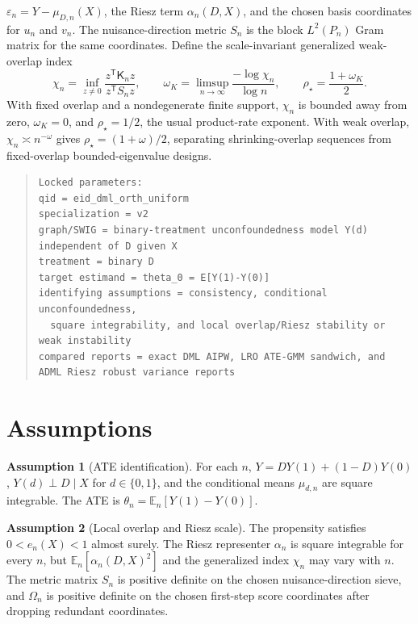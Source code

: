 \documentclass[11pt]{article}
\newcommand{\E}{\mathbb{E}}
\newcommand{\transpose}{\mathsf{T}}
\theoremstyle{definition}
\newtheorem{assumption}{Assumption}
\theoremstyle{plain}
\theoremstyle{remark}
\begin{document}
\(\varepsilon_n=Y-\mu_{D,n}(X)\), the Riesz term \(\alpha_n(D,X)\), and the
chosen basis coordinates for \(u_n\) and \(v_n\).  The nuisance-direction
metric \(S_n\) is the block \(L^2(P_n)\) Gram matrix for the same coordinates.
Define the scale-invariant generalized weak-overlap index
\[
\chi_n=\inf_{z\ne 0}\frac{z^{\transpose}\mathsf K_nz}{z^{\transpose}S_nz},
\qquad
\omega_K=\limsup_{n\to\infty}\frac{-\log \chi_n}{\log n},
\qquad
\rho_\star=\frac{1+\omega_K}{2}.
\]
With fixed overlap and a nondegenerate finite support, \(\chi_n\) is bounded
away from zero, \(\omega_K=0\), and \(\rho_\star=1/2\), the usual
product-rate exponent.  With weak overlap, \(\chi_n\asymp n^{-\omega}\) gives
\(\rho_\star=(1+\omega)/2\), separating shrinking-overlap sequences from
fixed-overlap bounded-eigenvalue designs.

\begin{quote}
\begin{verbatim}
Locked parameters:
qid = eid_dml_orth_uniform
specialization = v2
graph/SWIG = binary-treatment unconfoundedness model Y(d) independent of D given X
treatment = binary D
target estimand = theta_0 = E[Y(1)-Y(0)]
identifying assumptions = consistency, conditional unconfoundedness,
  square integrability, and local overlap/Riesz stability or weak instability
compared reports = exact DML AIPW, LRO ATE-GMM sandwich, and ADML Riesz robust variance reports
\end{verbatim}
\end{quote}

\section{Assumptions}
\begin{assumption}[ATE identification]\label{ass:ate-id}
For each \(n\), \(Y=DY(1)+(1-D)Y(0)\), \(Y(d)\perp D\mid X\) for
\(d\in\{0,1\}\), and the conditional means \(\mu_{d,n}\) are square
integrable.  The ATE is \(\theta_n=\E_n[Y(1)-Y(0)]\).
\end{assumption}

\begin{assumption}[Local overlap and Riesz scale]\label{ass:overlap}
The propensity satisfies \(0<e_n(X)<1\) almost surely.  The Riesz representer
\(\alpha_n\) is square integrable for every \(n\), but
\(\E_n[\alpha_n(D,X)^2]\) and the generalized index \(\chi_n\) may vary with
\(n\).  The metric matrix \(S_n\) is positive definite on the chosen
nuisance-direction sieve, and \(\Omega_n\) is positive definite on the chosen
first-step score coordinates after dropping redundant coordinates.
\end{assumption}
\end{document}
